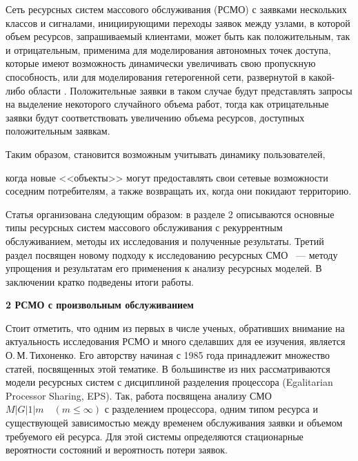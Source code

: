 \documentclass[a4paper,12pt]{article}
\begin{document}
Сеть ресурсных систем массового обслуживания (РСМО) с заявками нескольких классов и сигналами, инициирующими переходы заявок между узлами, в которой объем ресурсов, запрашиваемый клиентами, может быть как положительным, так и отрицательным, применима для моделирования автономных точек доступа, которые имеют возможность динамически увеличивать свою пропускную способность, или для моделирования гетерогенной сети, развернутой в какой-либо области \cite{Sopin_12_2017,Sopin_13_2017,Naumov_14_2017,Naumov_15_2017}. Положительные заявки в таком случае будут представлять запросы на выделение некоторого случайного объема работ, тогда как отрицательные заявки будут соответствовать увеличению объема ресурсов, доступных положительным заявкам.

Таким образом, становится возможным учитывать динамику пользователей,


когда новые <<объекты>> могут предоставлять свои сетевые возможности соседним потребителям, а также возвращать их, когда они покидают территорию.



Статья организована следующим образом: в разделе 2 описываются основные типы ресурсных систем массового обслуживания с рекуррентным обслуживанием, методы их исследования и полученные результаты. Третий раздел посвящен новому подходу к исследованию ресурсных СМО ~--- методу упрощения и результатам его применения к анализу ресурсных моделей. В заключении кратко подведены итоги работы.



\vspace{\baselineskip}     %




\noindent

\textbf{2 РСМО с произвольным обслуживанием}



Стоит отметить, что одним из первых в числе ученых, обративших внимание на актуальность исследования РСМО и много сделавших для ее изучения, является О.\,М.\,Тихоненко. Его авторству начиная с 1985 года \cite{Tihonenko_27_1985} принадлежит множество статей, посвященных этой тематике. В большинстве из них рассматриваются модели ресурсных систем с дисциплиной разделения процессора (Egalitarian Processor Sharing, EPS). Так, работа \cite{Tihonenko_22_2001} посвящена анализу СМО $M|G|1|m \quad (m\leq\infty)$ с разделением процессора, одним типом ресурса и существующей зависимостью между временем обслуживания заявки и объемом требуемого ей ресурса. Для этой системы определяются стационарные вероятности состояний и вероятность потери заявок.
\end{document}
